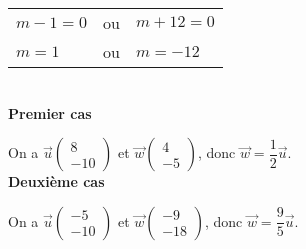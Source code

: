 \begin{tabular}{lll}
$ m-1 = 0$ & ou & $m+12 = 0$ \\
$m = 1$ & ou & $ m = -12 $ \\
\end{tabular}\\

\textbf{Premier cas}

On a $\vec{u}\left(\begin{array}{c} 8\\ -10 \end{array}\right)$ et $\overrightarrow{w}\left(\begin{array}{c} 4\\ -5 \end{array}\right)$, donc $\overrightarrow{w} = \dfrac{1}{2} \vec{u}$.\\

\textbf{Deuxième cas}

On a $\vec{u}\left(\begin{array}{c} -5\\ -10 \end{array}\right)$ et $\overrightarrow{w}\left(\begin{array}{c} -9\\ -18 \end{array}\right)$, donc $\overrightarrow{w} = \dfrac{9}{5} \vec{u}$.


\ifdefined\COMPLETE
\else
    
\fi